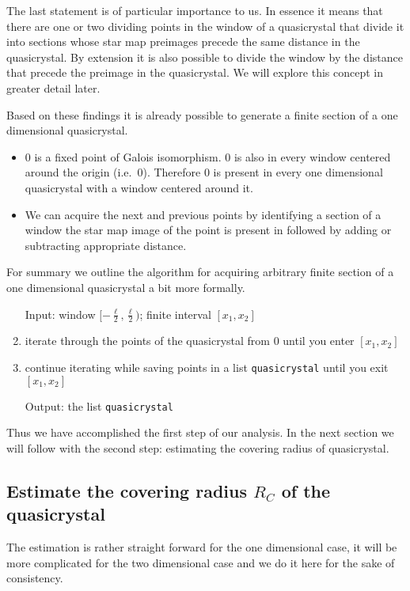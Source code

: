 \documentclass[text.tex]{subfiles}
\begin{document}
The last statement is of particular importance to us. In essence it means that there are one or two dividing points in the window of a quasicrystal that divide it into sections whose star map preimages precede the same distance in the quasicrystal. By extension it is also possible to divide the window by the distance that precede the preimage in the quasicrystal. We will explore this concept in greater detail later. 

Based on these findings it is already possible to generate a finite section of a one dimensional quasicrystal. 
\begin{itemize}
\item $0$ is a fixed point of Galois isomorphism. $0$ is also in every window centered around the origin (i.e.\ $0$). Therefore $0$ is present in every one dimensional quasicrystal with a window centered around it. 
\item We can acquire the next and previous points by identifying a section of a window the star map image of the point is present in followed by adding or subtracting appropriate distance. 
\end{itemize}

For summary we outline the algorithm for acquiring arbitrary finite section of a one dimensional quasicrystal a bit more formally. 

\begin{enumerate}
\item[Input:] window $[-\frac{\ell}{2},\frac{\ell}{2})$; finite interval $[x_1,x_2]$
\item iterate through the points of the quasicrystal from $0$ until you enter $[x_1,x_2]$
\item continue iterating while saving points in a list \texttt{quasicrystal} until you exit $[x_1,x_2]$
\item[Output:] the list \texttt{quasicrystal}
\end{enumerate}

Thus we have accomplished the first step of our analysis. In the next section we will follow with the second step: estimating the covering radius of quasicrystal. 

\subsection{Estimate the covering radius $R_C$ of the quasicrystal}
The estimation is rather straight forward for the one dimensional case, it will be more complicated for the two dimensional case and we do it here for the sake of consistency. 
\end{document}
